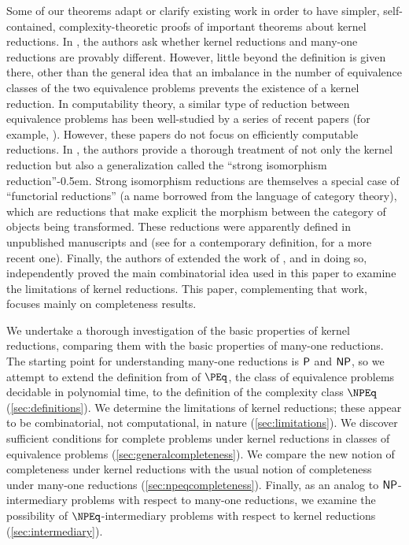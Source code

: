 Some of our theorems adapt or clarify existing work in order to have simpler, self-contained, complexity-theoretic proofs of important theorems about kernel reductions.
In \autocite{fg11}, the authors ask whether kernel reductions and many-one reductions are provably different.
However, little beyond the definition is given there, other than the general idea that an imbalance in the number of equivalence classes of the two equivalence problems prevents the existence of a kernel reduction.
In computability theory, a similar type of reduction between equivalence problems has been well-studied by a series of recent papers (for example, \autocite{gg01, ff12, ffn12, chm12, imnn13, almnss14, mn14}).
However, these papers do not focus on efficiently computable reductions.
In \autocite{bcffm}, the authors provide a thorough treatment of not only the kernel reduction but also a generalization called the ``strong isomorphism reduction''\kern-0.5em.
Strong isomorphism reductions are themselves a special case of ``functorial reductions'' (a name borrowed from the language of category theory), which are reductions that make explicit the morphism between the category of objects being transformed.
These reductions were apparently defined in unpublished manuscripts \autocite{babai77} and \autocite{kucera76} (see \autocite[Section~15]{zkt85} for a contemporary definition, \autocite[Section~7]{babai14} for a more recent one).
Finally, the authors of \autocite{gz14} extended the work of \autocite{bcffm}, and in doing so, independently proved the main combinatorial idea used in this paper to examine the limitations of kernel reductions.
This paper, complementing that work, focuses mainly on completeness results.

We undertake a thorough investigation of the basic properties of kernel reductions, comparing them with the basic properties of many-one reductions.
The starting point for understanding many-one reductions is $\P$ and $\NP$, so we attempt to extend the definition from \autocite{fg11} of $\PEq$, the class of equivalence problems decidable in polynomial time, to the definition of the complexity class $\NPEq$ (\autoref{sec:definitions}).
We determine the limitations of kernel reductions; these appear to be combinatorial, not computational, in nature (\autoref{sec:limitations}).
We discover sufficient conditions for complete problems under kernel reductions in classes of equivalence problems (\autoref{sec:generalcompleteness}).
We compare the new notion of completeness under kernel reductions with the usual notion of completeness under many-one reductions (\autoref{sec:npeqcompleteness}).
Finally, as an analog to $\NP$-intermediary problems with respect to many-one reductions, we examine the possibility of $\NPEq$-intermediary problems with respect to kernel reductions (\autoref{sec:intermediary}).


